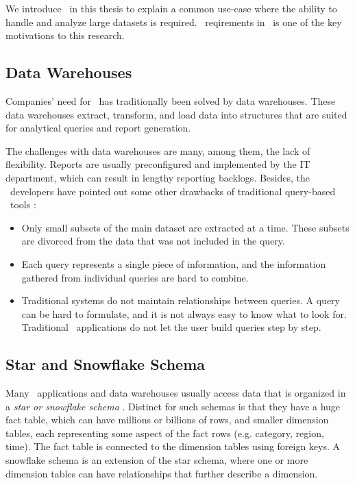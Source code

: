 We introduce \bi~in this thesis to explain a common use-case where the ability to handle and analyze large datasets is required. \bi~reqirements in \gap~is one of the key motivations to this research. 

\subsection{Data Warehouses}
\label{sub:Data Warehouses}
Companies' need for \bi~has traditionally been solved by data warehouses. These data warehouses extract, transform, and load data into structures that are suited for analytical queries and report generation.

The challenges with data warehouses are many, among them, the lack of flexibility. Reports are usually preconfigured and implemented by the IT department, which can result in lengthy reporting backlogs. Besides, the \qlikview~developers have pointed out some other drawbacks of traditional query-based \bi~tools \cite{Qlik2010-ya}:
\begin{itemize}
  \item Only small subsets of the main dataset are extracted at a time. These subsets are divorced from the data that was not included in the query.
  \item Each query represents a single piece of information, and the information gathered from individual queries are hard to combine.
  \item Traditional systems do not maintain relationships between queries. A query can be hard to formulate, and it is not always easy to know what to look for. Traditional \bi~applications do not let the user build queries step by step.
\end{itemize}

\subsection{Star and Snowflake Schema}
\label{sub:Star and Snowflake Schema}
Many \bi~applications and data warehouses usually access data that is organized in a \textit{star or snowflake schema} \cite{Barber2012-xt}. Distinct for such schemas is that they have a huge fact table, which can have millions or billions of rows, and smaller dimension tables, each representing some aspect of the fact rows (e.g. category, region, time). The fact table is connected to the dimension tables using foreign keys. A snowflake schema is an extension of the star schema, where one or more dimension tables can have relationships that further describe a dimension.

